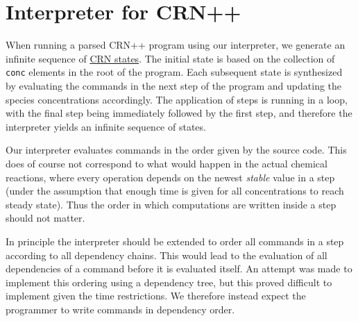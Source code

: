 \section{Interpreter for CRN++}\label{sec:interpreter} %
When running a parsed CRN++ program using our interpreter, we generate an infinite sequence of \hyperref[sec:states]{CRN states}. The initial state is based on the collection of \texttt{conc} elements in the root of the program. Each subsequent state is synthesized by evaluating the commands in the next step of the program and updating the species concentrations accordingly. The application of steps is running in a loop, with the final step being immediately followed by the first step, and therefore the interpreter yields an infinite sequence of states.

Our interpreter evaluates commands in the order given by the source code. This does of course not correspond to what would happen in the actual chemical reactions, where every operation depends on the newest \textit{stable} value in a step (under the assumption that enough time is given for all concentrations to reach steady state). Thus the order in which computations are written inside a step should not matter.

In principle the interpreter should be extended to order all commands in a step according to all dependency chains. This would lead to the evaluation of all dependencies of a command before it is evaluated itself. An attempt was made to implement this ordering using a dependency tree, but this proved difficult to implement given the time restrictions. We therefore instead expect the programmer to write commands in dependency order.